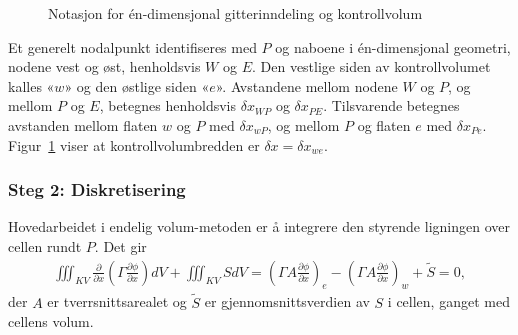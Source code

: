 \begin{figure}[ht]
\centering
{}
\caption{Notasjon for én-dimensjonal gitterinndeling og kontrollvolum}
\label{fig:grid-notation}
\end{figure}

Et generelt nodalpunkt identifiseres med $P$ og naboene i én-dimensjonal geometri, nodene vest og øst, henholdsvis $W$ og $E$. Den vestlige siden av kontrollvolumet kalles «$w$» og den østlige siden «$e$». Avstandene mellom nodene $W$ og $P$, og mellom $P$ og $E$, betegnes henholdsvis $\delta x_{WP}$ og $\delta x_{PE}$. Tilsvarende betegnes avstanden mellom flaten $w$ og $P$ med $\delta x_{wP}$, og mellom $P$ og flaten $e$ med $\delta x_{Pe}$. Figur~\ref{fig:grid-notation} viser at kontrollvolumbredden er $\delta x = \delta x_{we}$.

\subsubsection*{Steg 2: Diskretisering}
Hovedarbeidet i endelig volum-metoden er å integrere den styrende ligningen over cellen rundt $P$. Det gir
\begin{align}\label{eV_discretisering}
\iiint_{KV} \frac{\partial}{\partial x} \left(\Gamma \frac{\partial\phi}{\partial x} \right) dV + \iiint_{KV} S dV = \left(\Gamma A \frac{\partial\phi}{\partial x}\right)_e- \left( \Gamma A \frac{\partial\phi}{\partial x} \right)_w + \tilde{S} = 0,
\end{align}
der $A$ er tverrsnittsarealet og $\tilde{S}$ er gjennomsnittsverdien av $S$ i cellen, ganget med cellens volum.

